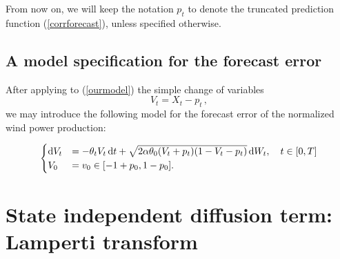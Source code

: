 \documentclass[11pt]{article}
\theoremstyle{definition}
\begin{document}
From now on, we will keep the notation $p_t$ to denote the truncated prediction function (\ref{corrforecast}), unless specified otherwise. 

\subsection{A model specification for the forecast error}
 After applying to (\ref{ourmodel}) the simple change of variables $$V_t = X_t - p_t \,,$$ we may introduce the following model for the forecast error of the normalized wind power production: 

\begin{equation}
\begin{cases}
\dif V_t&=  - \theta_t V_t\dif t + \sqrt{2 \alpha \theta_0 (V_t +p_t ) (1-V_t-p_t)}\dif W_t, \quad t \in [0,T]  \\
V_0&=  v_0\in [-1 + p_0,1 - p_0].
\end{cases}  \label{VtSDE}
\end{equation}



\section{State independent diffusion term: Lamperti transform} \label{Section_4}
\end{document}

